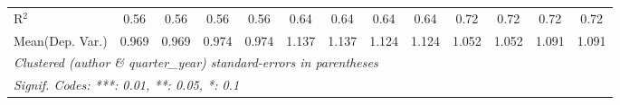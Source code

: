 \begin{tabular}{lcccccccccccc}
   R$^2$                                    & 0.56         & 0.56     & 0.56    & 0.56        & 0.64         & 0.64     & 0.64         & 0.64     & 0.72    & 0.72        & 0.72    & 0.72\\  
Mean(Dep. Var.) & 0.969 & 0.969 & 0.974 & 0.974 & 1.137 & 1.137 & 1.124 & 1.124 & 1.052 & 1.052 & 1.091 & 1.091 \\
   \midrule \midrule
   \multicolumn{13}{l}{\emph{Clustered (author \& quarter\_year) standard-errors in parentheses}}\\
   \multicolumn{13}{l}{\emph{Signif. Codes: ***: 0.01, **: 0.05, *: 0.1}}\\
\end{tabular}
\par\endgroup
